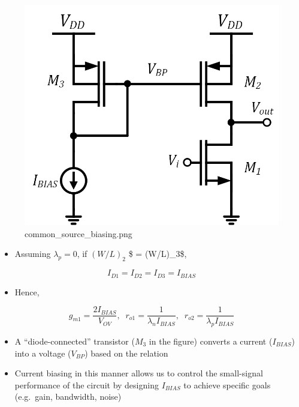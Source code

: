 \documentclass[11pt]{article}
\providecommand{\tightlist}{%
      \setlength{\itemsep}{0pt}\setlength{\parskip}{0pt}}
\begin{document}
    \begin{figure}
\centering
\includegraphics{common_source_biasing.png}
\caption{common\_source\_biasing.png}
\end{figure}

    \begin{itemize}
\tightlist
\item
  Assuming \(\lambda_p = 0\), if \((W/L)_2\) \$ = (W/L)\_3\$,
\end{itemize}

\begin{equation}
I_{D1} = I_{D2} = I_{D3} = I_{BIAS}
\end{equation}

\begin{itemize}
\tightlist
\item
  Hence,
\end{itemize}

\begin{equation}
g_{m1} = \dfrac{2I_{BIAS}}{V_{OV}}, \;\; r_{o1} = \dfrac{1}{\lambda_n I_{BIAS}}, \;\; r_{o2} = \dfrac{1}{\lambda_p I_{BIAS}} 
\end{equation}

    \begin{itemize}
\tightlist
\item
  A ``diode-connected'' transistor (\(M_3\) in the figure) converts a
  current (\(I_{BIAS}\)) into a voltage (\(V_{BP}\)) based on the
  relation
\item
  Current biasing in this manner allows us to control the small-signal
  performance of the circuit by designing \(I_{BIAS}\) to achieve
  specific goals (e.g.~gain, bandwidth, noise)
\end{itemize}
\end{document}
